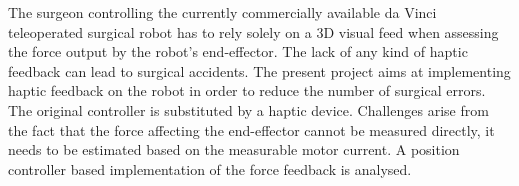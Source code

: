 The surgeon controlling the currently commercially available da Vinci teleoperated surgical robot has to rely solely on a 3D visual feed when assessing the force output by the robot's end-effector. The lack of any kind of haptic feedback can lead to surgical accidents. The present project aims at implementing haptic feedback on the robot in order to reduce the number of surgical errors.
The original controller is substituted by a haptic device.
Challenges arise from the fact that the force affecting the end-effector cannot be measured directly, it needs to be estimated based on the measurable motor current. A position controller based implementation of the force feedback is analysed.